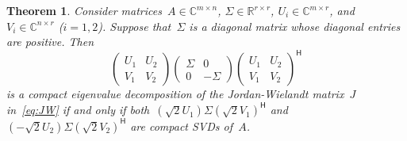 \documentclass[11pt,a4paper]{article}  %
\numberwithin{equation}{section}
\newtheorem{theorem}{Theorem}%
\theoremstyle{definition}
\def\RR{\mathbb{R}}
\def\CC{\mathbb{C}}
\newcommand{\hmt}{{\scriptscriptstyle{{\mathsf{H}}}}}
\begin{document}
\begin{theorem}
  \label{th:lanczos}
  Consider matrices~$A\in \CC^{m\times n}$, $\Sigma \in \RR^{r\times r}$, $U_i \in
  \CC^{m\times r}$, and $V_i \in \CC^{n\times r}$ \textnormal{(}$i=1,2$\textnormal{)}.
  Suppose that~$\Sigma$ is a diagonal matrix
  whose diagonal entries are positive. Then
  \begin{equation}
    \label{eq:evdJ}
    \begin{pmatrix}
      U_1 & U_2 \\
      V_1 & V_2
    \end{pmatrix}
    \begin{pmatrix}
      \Sigma & 0\\
      0 & -\Sigma
    \end{pmatrix}
    \begin{pmatrix}
      U_1 & U_2 \\
      V_1 & V_2
    \end{pmatrix}^\hmt
  \end{equation}
  is a compact eigenvalue decomposition of the Jordan-Wielandt matrix~$J$ in~\eqref{eq:JW}
  if and only if both~$(\sqrt{2} U_1)\Sigma (\sqrt{2} V_1)^\hmt$ and~$(-\sqrt{2}U_2)\Sigma (\sqrt{2}V_2)^\hmt$ are
  compact SVDs of~$A$.
\end{theorem}
\end{document}
